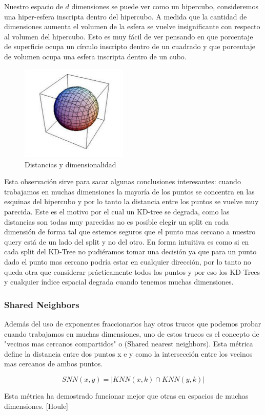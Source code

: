 Nuestro espacio de $d$ dimensiones se puede ver como un hipercubo, consideremos una hiper-esfera inscripta dentro del hipercubo. A medida que la cantidad de dimensiones aumenta el volumen de la esfera se vuelve insignificante con respecto al volumen del hipercubo. Esto es muy fácil de ver pensando en que porcentaje de superficie ocupa un círculo inscripto dentro de un cuadrado y que porcentaje de volumen ocupa una esfera inscripta dentro de un cubo.

\begin{figure}[!htb]
\centering
\includegraphics[width=2in]{figures/dimcurse-fig-1.png}
\caption{Distancias y dimensionalidad}

\end{figure}

Esta observación sirve para sacar algunas conclusiones interesantes: cuando trabajamos en muchas dimensiones la mayoría de los puntos se concentra en las esquinas del hipercubo y por lo tanto la distancia entre los puntos se vuelve muy parecida. Este es el motivo por el cual un KD-tree se degrada, como las distancias son todas muy parecidas no es posible elegir un split en cada dimensión de forma tal que estemos seguros que el punto mas cercano a nuestro query está de un lado del split y no del otro. En forma intuitiva es como si en cada split del KD-Tree no pudiéramos tomar una decisión ya que para un punto dado el punto mas cercano podría estar en cualquier dirección, por lo tanto no queda otra que considerar prácticamente todos los puntos y por eso los KD-Trees y cualquier índice espacial degrada cuando tenemos muchas dimensiones. 

\subsubsection{Shared Neighbors}

Además del uso de exponentes fraccionarios hay otros trucos que podemos probar cuando trabajamos en muchas dimensiones, uno de estos trucos es el concepto de "vecinos mas cercanos compartidos" o (Shared nearest neighbors). Esta métrica define la distancia entre dos puntos x e y como la intersección entre los vecinos mas cercanos de ambos puntos.

$$SNN(x,y) = |KNN(x,k) \cap KNN(y,k)|$$

Esta métrica ha demostrado funcionar mejor que otras en espacios de muchas dimensiones. [Houle]

